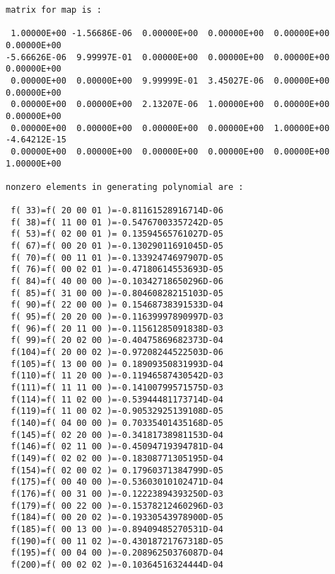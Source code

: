 \begin{footnotesize}
\begin{verbatim}
matrix for map is :

 1.00000E+00 -1.56686E-06  0.00000E+00  0.00000E+00  0.00000E+00  0.00000E+00
-5.66626E-06  9.99997E-01  0.00000E+00  0.00000E+00  0.00000E+00  0.00000E+00
 0.00000E+00  0.00000E+00  9.99999E-01  3.45027E-06  0.00000E+00  0.00000E+00
 0.00000E+00  0.00000E+00  2.13207E-06  1.00000E+00  0.00000E+00  0.00000E+00
 0.00000E+00  0.00000E+00  0.00000E+00  0.00000E+00  1.00000E+00 -4.64212E-15
 0.00000E+00  0.00000E+00  0.00000E+00  0.00000E+00  0.00000E+00  1.00000E+00

nonzero elements in generating polynomial are :

 f( 33)=f( 20 00 01 )=-0.81161528916714D-06
 f( 38)=f( 11 00 01 )=-0.54767003357242D-05
 f( 53)=f( 02 00 01 )= 0.13594565761027D-05
 f( 67)=f( 00 20 01 )=-0.13029011691045D-05
 f( 70)=f( 00 11 01 )=-0.13392474697907D-05
 f( 76)=f( 00 02 01 )=-0.47180614553693D-05
 f( 84)=f( 40 00 00 )=-0.10342718650296D-06
 f( 85)=f( 31 00 00 )=-0.80460828215103D-05
 f( 90)=f( 22 00 00 )= 0.15468738391533D-04
 f( 95)=f( 20 20 00 )=-0.11639997890997D-03
 f( 96)=f( 20 11 00 )=-0.11561285091838D-03
 f( 99)=f( 20 02 00 )=-0.40475869682373D-04
 f(104)=f( 20 00 02 )=-0.97208244522503D-06
 f(105)=f( 13 00 00 )= 0.18909350831993D-04
 f(110)=f( 11 20 00 )=-0.11946587430542D-03
 f(111)=f( 11 11 00 )=-0.14100799571575D-03
 f(114)=f( 11 02 00 )=-0.53944481173714D-04
 f(119)=f( 11 00 02 )=-0.90532925139108D-05
 f(140)=f( 04 00 00 )= 0.70335401435168D-05
 f(145)=f( 02 20 00 )=-0.34181738981153D-04
 f(146)=f( 02 11 00 )=-0.45094719394781D-04
 f(149)=f( 02 02 00 )=-0.18308771305195D-04
 f(154)=f( 02 00 02 )= 0.17960371384799D-05
 f(175)=f( 00 40 00 )=-0.53603010102471D-04
 f(176)=f( 00 31 00 )=-0.12223894393250D-03
 f(179)=f( 00 22 00 )=-0.15378212460296D-03
 f(184)=f( 00 20 02 )=-0.19330543978900D-05
 f(185)=f( 00 13 00 )=-0.89409485270531D-04
 f(190)=f( 00 11 02 )=-0.43018721767318D-05
 f(195)=f( 00 04 00 )=-0.20896250376087D-04
 f(200)=f( 00 02 02 )=-0.10364516324444D-04
\end{verbatim}
\end{footnotesize}
\newpage
